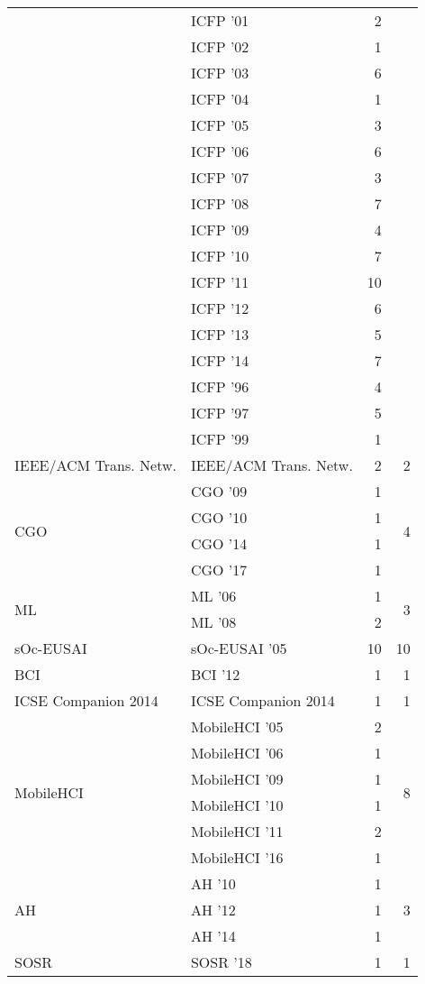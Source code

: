 \begin{table*}[t]
\begin{tabular}{llrr}
& ICFP '01 & 2 &\\
& ICFP '02 & 1 &\\
& ICFP '03 & 6 &\\
& ICFP '04 & 1 &\\
& ICFP '05 & 3 &\\
& ICFP '06 & 6 &\\
& ICFP '07 & 3 &\\
& ICFP '08 & 7 &\\
& ICFP '09 & 4 &\\
& ICFP '10 & 7 &\\
& ICFP '11 & 10 &\\
& ICFP '12 & 6 &\\
& ICFP '13 & 5 &\\
& ICFP '14 & 7 &\\
& ICFP '96 & 4 &\\
& ICFP '97 & 5 &\\
& ICFP '99 & 1 &\\
\multirow{1}{*}{IEEE/ACM Trans. Netw.} & IEEE/ACM Trans. Netw. & 2 & \multirow{1}{*}{2}\\
\multirow{4}{*}{CGO } & CGO '09 & 1 & \multirow{4}{*}{4}\\
& CGO '10 & 1 &\\
& CGO '14 & 1 &\\
& CGO '17 & 1 &\\
\multirow{2}{*}{ML } & ML '06 & 1 & \multirow{2}{*}{3}\\
& ML '08 & 2 &\\
\multirow{1}{*}{sOc-EUSAI } & sOc-EUSAI '05 & 10 & \multirow{1}{*}{10}\\
\multirow{1}{*}{BCI } & BCI '12 & 1 & \multirow{1}{*}{1}\\
\multirow{1}{*}{ICSE Companion 2014} & ICSE Companion 2014 & 1 & \multirow{1}{*}{1}\\
\multirow{6}{*}{MobileHCI } & MobileHCI '05 & 2 & \multirow{6}{*}{8}\\
& MobileHCI '06 & 1 &\\
& MobileHCI '09 & 1 &\\
& MobileHCI '10 & 1 &\\
& MobileHCI '11 & 2 &\\
& MobileHCI '16 & 1 &\\
\multirow{3}{*}{AH } & AH '10 & 1 & \multirow{3}{*}{3}\\
& AH '12 & 1 &\\
& AH '14 & 1 &\\
\multirow{1}{*}{SOSR } & SOSR '18 & 1 & \multirow{1}{*}{1}\\

\end{tabular}
\end{table*}
